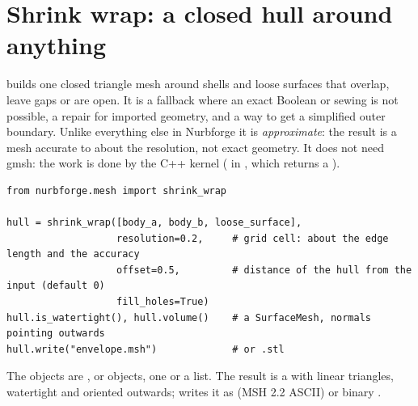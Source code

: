 \section{Shrink wrap: a closed hull around anything}\label{sec:mesh-shrinkwrap}

 builds one closed triangle mesh around shells and loose surfaces that
overlap, leave gaps or are open. It is a fallback where an exact Boolean or sewing is not
possible, a repair for imported geometry, and a way to get a simplified outer boundary. Unlike
everything else in Nurbforge it is \emph{approximate}: the result is a mesh accurate to about
the resolution, not exact geometry. It does not need gmsh: the work is done by the C++ kernel
( in , which returns a ).

\begin{lstlisting}[style=python]
from nurbforge.mesh import shrink_wrap

hull = shrink_wrap([body_a, body_b, loose_surface],
                   resolution=0.2,     # grid cell: about the edge length and the accuracy
                   offset=0.5,         # distance of the hull from the input (default 0)
                   fill_holes=True)
hull.is_watertight(), hull.volume()    # a SurfaceMesh, normals pointing outwards
hull.write("envelope.msh")             # or .stl
\end{lstlisting}

The objects are ,  or  objects, one or a
list. The result is a  with linear triangles, watertight and oriented
outwards;  writes it as  (MSH 2.2 ASCII) or binary
.

